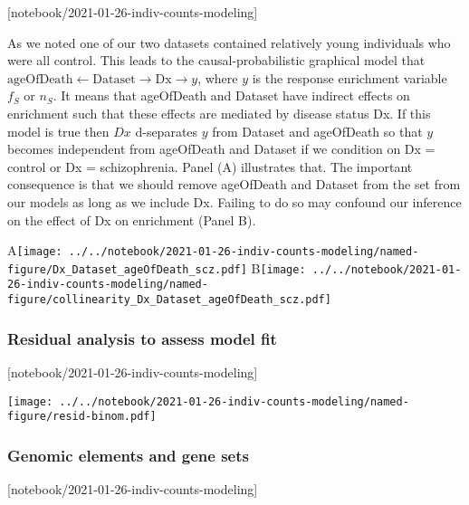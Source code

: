 \documentclass[letterpaper]{article}
\begin{document}
[notebook/2021-01-26-indiv-counts-modeling]

As we noted one of our two datasets contained relatively young individuals who
were all control.  This leads to the causal-probabilistic graphical model that
\(\mathrm{ageOfDeath} \leftarrow \mathrm{Dataset} \rightarrow \mathrm{Dx}
	\rightarrow y\)\), where \(y\) is the response enrichment variable
\(f_S\) or \(n_S\).  It means that ageOfDeath and
Dataset have indirect effects on enrichment such that these effects are
mediated by disease status Dx. If this model is true then \(Dx\) d-separates
\(y\) from Dataset and ageOfDeath so that \(y\) becomes independent from
ageOfDeath and Dataset if we condition on Dx = control or Dx =
schizophrenia.  Panel (A) illustrates that.  The important consequence is
that we should remove ageOfDeath and Dataset from the set from our models as long
as we include Dx.  Failing to do so may confound our
inference on the effect of Dx on enrichment (Panel B).

A\texttt{[image: ../../notebook/2021-01-26-indiv-counts-modeling/named-figure/Dx\_Dataset\_ageOfDeath\_scz.pdf]}
B\texttt{[image: ../../notebook/2021-01-26-indiv-counts-modeling/named-figure/collinearity\_Dx\_Dataset\_ageOfDeath\_scz.pdf]}

\subsubsection*{Residual analysis to assess model fit }

[notebook/2021-01-26-indiv-counts-modeling]

\texttt{[image: ../../notebook/2021-01-26-indiv-counts-modeling/named-figure/resid-binom.pdf]}

\subsubsection*{Genomic elements and gene sets}

[notebook/2021-01-26-indiv-counts-modeling]
\end{document}
